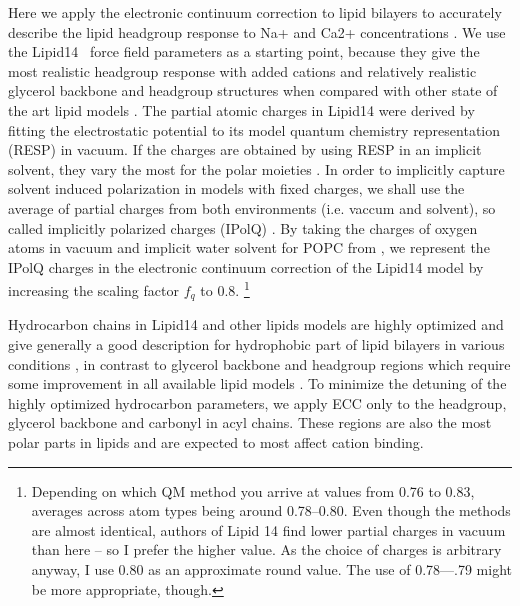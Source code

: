 \documentclass[aip,jcp,twocolumn]{revtex4}
\begin{document}
Here we apply the electronic continuum correction to lipid bilayers to accurately 
describe the lipid headgroup response to Na+ and Ca2+ concentrations \cite{catte16}. 
We use the Lipid14~\cite{dickson14} force field parameters as a starting point,
because they give the most realistic headgroup response with added cations 
and relatively realistic glycerol backbone and headgroup structures
when compared with other state of the art lipid models \cite{botan15,catte16}.
The partial atomic charges in Lipid14 were derived by fitting the electrostatic 
potential to its model quantum chemistry representation (RESP\cite{RESP_paper}) in vacuum.
If the charges are obtained by using RESP in an implicit solvent, 
they vary the most for the polar moieties \cite{maciejewski14}. 
In order to implicitly capture solvent induced polarization 
in models with fixed charges, 
we shall use the average of partial charges 
from both environments (i.e. vaccum and solvent),
so called implicitly polarized charges (IPolQ) \cite{ipolq2013}. 
By taking the charges of oxygen atoms in vacuum and implicit water solvent for POPC from \cite{maciejewski14}, 
we represent the IPolQ charges in the electronic continuum correction of the Lipid14 model
by increasing the scaling factor $f_q$ to $0.8$. 
\footnote{Depending on which QM method you arrive at values from 0.76 to 0.83, averages across atom types being around 0.78--0.80. Even though the methods are almost identical, authors of Lipid 14 find lower partial charges in vacuum than here -- so I prefer the higher value. As the choice of charges is arbitrary anyway, I use 0.80 as an approximate round value. The use of 0.78---.79 might be more appropriate, though.}

Hydrocarbon chains in Lipid14 and other lipids models are highly optimized and
give generally a good description for hydrophobic part of lipid bilayers
in various conditions \cite{ollila16},
in contrast to glycerol backbone and headgroup regions which require
some improvement in all available lipid models \cite{botan15}. 
To minimize the detuning of the highly optimized hydrocarbon
parameters, we apply ECC only
to the headgroup, glycerol backbone and carbonyl in acyl chains.
These regions are also the most polar parts in lipids and are expected
to most affect cation binding.   
\end{document}
